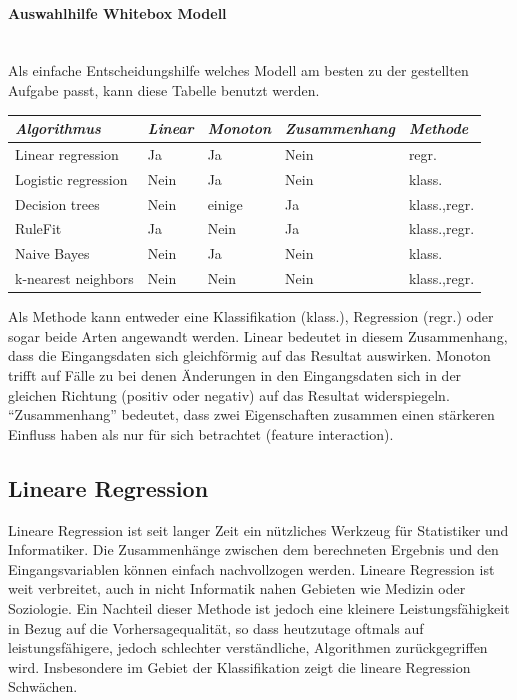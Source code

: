 \documentclass[
  12pt, %
  a4paper, %
  oneside, %
  openany, 
  numbers=noenddot, %
  BCOR=5mm, %
  parskip=half*, %
  thesis, %
]{bfhbook}
\newcommand{\parag}[1]{\paragraph*{#1}\mbox{}\\}
\begin{document}
\parag{Auswahlhilfe Whitebox Modell}
Als einfache Entscheidungshilfe welches Modell am besten zu der gestellten Aufgabe passt, kann diese Tabelle benutzt werden. 

\begin{table}[ht]
\begin{tabular}{@{} *5l @{}}    \toprule
	\emph{Algorithmus} & \emph{Linear} & \emph{Monoton} & \emph{Zusammenhang} & \emph{Methode}  \\\midrule
	Linear regression & Ja & Ja & 	Nein & regr. \\
	Logistic regression & Nein & Ja & 	Nein & klass. \\
	Decision trees & Nein & einige &	Ja & klass.,regr. \\
	RuleFit & Ja & Nein & Ja & 	klass.,regr. \\
	Naive Bayes	 & Nein & Ja & 	Nein & klass. \\
	k-nearest neighbors & Nein & Nein & Nein & klass.,regr. \\ \bottomrule
	 \hline
\end{tabular}
\end{table}

Als Methode kann entweder eine Klassifikation (klass.), Regression (regr.) oder sogar beide Arten angewandt werden. Linear bedeutet in diesem Zusammenhang, dass die Eingangsdaten sich gleichförmig auf das Resultat auswirken. Monoton trifft auf Fälle zu bei denen Änderungen in den Eingangsdaten sich in der gleichen Richtung (positiv oder negativ) auf das Resultat widerspiegeln. ``Zusammenhang'' bedeutet, dass zwei Eigenschaften zusammen einen stärkeren Einfluss haben als nur für sich betrachtet (feature interaction).

\subsection{Lineare Regression}
\label{lr}
Lineare Regression ist seit langer Zeit ein nützliches Werkzeug für Statistiker und Informatiker. Die Zusammenhänge zwischen dem berechneten Ergebnis und den Eingangsvariablen können einfach nachvollzogen werden. Lineare Regression ist weit verbreitet, auch in nicht Informatik nahen Gebieten wie Medizin oder Soziologie. Ein Nachteil dieser Methode ist jedoch eine kleinere Leistungsfähigkeit in Bezug auf die Vorhersagequalität, so dass heutzutage oftmals auf leistungsfähigere, jedoch schlechter verständliche, Algorithmen zurückgegriffen wird. Insbesondere im Gebiet der Klassifikation zeigt die lineare Regression Schwächen.
\end{document}
